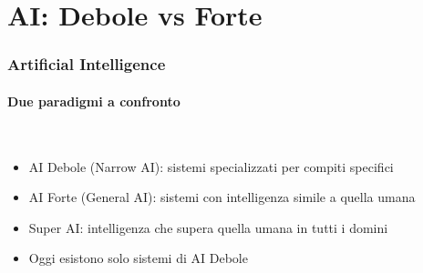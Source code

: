 \section{AI: Debole vs Forte} %
\label{sec:ai_types}
%
\begin{frame}[t,fragile] \frametitle{Artificial Intelligence}
	{\footnotesize
		\onslide<1->
            \framesubtitle{Due paradigmi a confronto}
            \vspace*{-15pt}
            \begin{minipage}[t]{\textwidth}
            \end{minipage}
            \\\vspace*{3pt}
	    	\begin{minipage}[t]{\textwidth}
				\begin{minipage}[t]{0.6\textwidth}
	    			\begin{itemize}[leftmargin=10pt,align=right]
						\onslide<2->\item[\alert{\faHandORight}] \alert{AI Debole (Narrow AI):} sistemi specializzati per compiti specifici
						\onslide<3->\item[\alert{\faHandORight}] \alert{AI Forte (General AI):} sistemi con intelligenza simile a quella umana
						\onslide<4->\item[\alert{\faHandORight}] \alert{Super AI:} intelligenza che supera quella umana in tutti i domini
						\onslide<5->\item[\alert{\faHandORight}] Oggi esistono \alert{solo} sistemi di AI Debole
					\end{itemize}
            	\end{minipage}
            	\begin{minipage}[t]{0.4\textwidth}
                	\centering
            	\end{minipage}
	    	\end{minipage}
	}
\end{frame}
